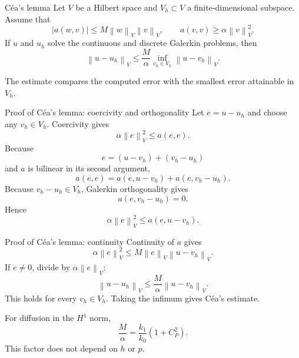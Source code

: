 \documentclass[11pt,aspectratio=169]{beamer}
\newcommand{\norm}[2][]{\left\lVert#2\right\rVert_{#1}}
\begin{document}
\begin{frame}{C\'ea's lemma}
Let $V$ be a Hilbert space and $V_h\subset V$ a finite-dimensional subspace.
Assume that
\[
  |a(w,v)|\leq M\norm[V]{w}\norm[V]{v},
  \qquad
  a(v,v)\geq\alpha\norm[V]{v}^2.
\]
If $u$ and $u_h$ solve the continuous and discrete Galerkin problems, then
\[
  \boxed{
  \norm[V]{u-u_h}
  \leq
  \frac{M}{\alpha}
  \inf_{v_h\in V_h}\norm[V]{u-v_h}.}
\]

The estimate compares the computed error with the smallest error attainable
in $V_h$.
\end{frame}

\begin{frame}{Proof of C\'ea's lemma: coercivity and orthogonality}
Let $e=u-u_h$ and choose any $v_h\in V_h$. Coercivity gives
\[
  \alpha\norm[V]{e}^2\leq a(e,e).
\]
Because
\[
  e=(u-v_h)+(v_h-u_h)
\]
and $a$ is bilinear in its second argument,
\[
  a(e,e)
  =a(e,u-v_h)+a(e,v_h-u_h).
\]
Because $v_h-u_h\in V_h$, Galerkin orthogonality gives
\[
  a(e,v_h-u_h)=0.
\]
Hence
\[
  \alpha\norm[V]{e}^2\leq a(e,u-v_h).
\]
\end{frame}

\begin{frame}{Proof of C\'ea's lemma: continuity}
Continuity of $a$ gives
\[
  \alpha\norm[V]{e}^2
  \leq
  M\norm[V]{e}\norm[V]{u-v_h}.
\]
If $e\ne0$, divide by $\alpha\norm[V]{e}$:
\[
  \norm[V]{u-u_h}
  \leq
  \frac{M}{\alpha}\norm[V]{u-v_h}.
\]
This holds for every $v_h\in V_h$. Taking the infimum gives C\'ea's estimate.

\vspace{0.25cm}
For diffusion in the $H^1$ norm,
\[
  \frac{M}{\alpha}
  =\frac{k_1}{k_0}(1+C_P^2).
\]
This factor does not depend on $h$ or $p$.
\end{frame}
\end{document}
